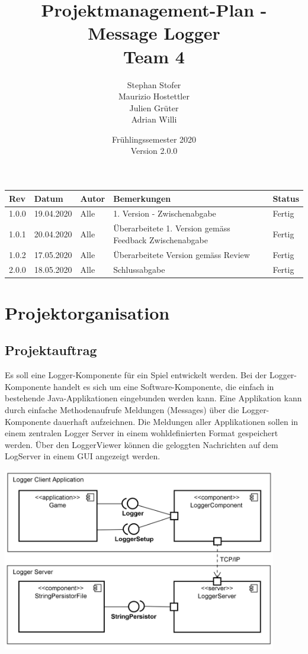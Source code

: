 \documentclass[11pt]{article}
\title{Projektmanagement-Plan - Message Logger \\
	Team 4}
\author{Stephan Stofer\\
	Maurizio Hostettler\\
	Julien Grüter\\
	Adrian Willi\\}
\date{Frühlingssemester 2020 \\
Version 2.0.0}
\begin{document}
\maketitle

\begin{table}[]
	\centering
	\begin{tabular}{|l|l|l|l|l|}
		\hline
		\textbf{Rev}   & \textbf{Datum} & \textbf{Autor} & \textbf{Bemerkungen} & \textbf{Status} \\ \hline
		1.0.0 & 19.04.2020 & Alle  & 1. Version - Zwischenabgabe & Fertig \\ \hline
		1.0.1 & 20.04.2020 & Alle & Überarbeitete 1. Version gemäss Feedback Zwischenabgabe                             & Fertig        \\ \hline
		1.0.2 &	17.05.2020 & Alle & Überarbeitete Version gemäss Review & Fertig        \\ \hline
		2.0.0 &	18.05.2020 & Alle & Schlussabgabe & Fertig        \\ \hline
	\end{tabular}
\end{table}

\newpage 
\tableofcontents{}
\newpage

\section{Projektorganisation}
\subsection{Projektauftrag}
Es soll eine Logger-Komponente für ein Spiel entwickelt werden. Bei der Logger-Komponente handelt es sich um eine Software-Komponente, die einfach in bestehende Java-Applikationen eingebunden werden kann. Eine Applikation kann durch einfache Methodenaufrufe Meldungen (Messages) über die Logger-Komponente dauerhaft aufzeichnen. Die Meldungen aller Applikationen sollen in einem zentralen Logger Server in einem wohldefinierten Format gespeichert werden. Über den LoggerViewer können die geloggten Nachrichten auf dem LogServer in einem GUI angezeigt werden.

\begin{center}
	\includegraphics[height=8cm,keepaspectratio]{images/Logger.JPG}
\end{center}
\end{document}
